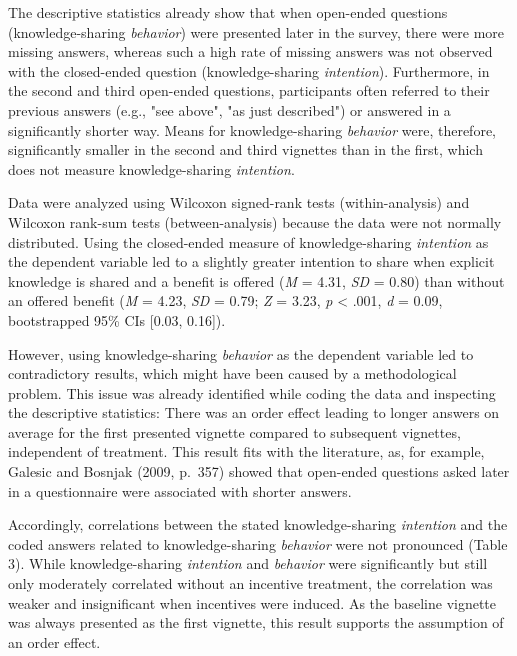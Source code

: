 \documentclass{article}
\begin{document}
The descriptive statistics already show that when open-ended questions (knowledge-sharing \emph{behavior}) were presented later in the survey, there were more missing answers, whereas such a high rate of missing answers was not observed with the closed-ended question (knowledge-sharing \emph{intention}). Furthermore, in the second and third open-ended questions, participants often referred to their previous answers (e.g., "see above", "as just described") or answered in a significantly shorter way. Means for knowledge-sharing \emph{behavior} were, therefore, significantly smaller in the second and third vignettes than in the first, which does not measure knowledge-sharing \emph{intention}.

Data were analyzed using Wilcoxon signed-rank tests (within-analysis) and Wilcoxon rank-sum tests (between-analysis) because the data were not normally distributed. Using the closed-ended measure of knowledge-sharing \emph{intention} as the dependent variable led to a slightly greater intention to share when explicit knowledge is shared and a benefit is offered (\emph{M} = 4.31, \emph{SD} = 0.80) than without an offered benefit (\emph{M} = 4.23, \emph{SD} = 0.79; \emph{Z }= 3.23, \emph{p} < .001, \emph{d} = 0.09, bootstrapped 95\% CIs [0.03, 0.16]).

However, using knowledge-sharing \emph{behavior} as the dependent variable led to contradictory results, which might have been caused by a methodological problem. This issue was already identified while coding the data and inspecting the descriptive statistics: There was an order effect leading to longer answers on average for the first presented vignette compared to subsequent vignettes, independent of treatment. This result fits with the literature, as, for example, Galesic and Bosnjak (2009, p. 357) showed that open-ended questions asked later in a questionnaire were associated with shorter answers. 

Accordingly, correlations between the stated knowledge-sharing \emph{intention} and the coded answers related to knowledge-sharing \emph{behavior} were not pronounced (Table 3). While knowledge-sharing \emph{intention} and \emph{behavior} were significantly but still only moderately correlated without an incentive treatment, the correlation was weaker and insignificant when incentives were induced. As the baseline vignette was always presented as the first vignette, this result supports the assumption of an order effect. 

\textbf{}
\end{document}
